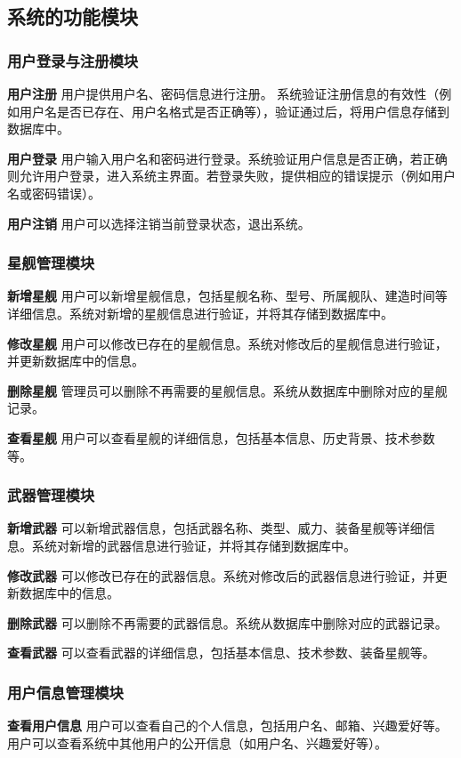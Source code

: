 \documentclass{base}
\begin{document}
\subsection{系统的功能模块}

\subsubsection{用户登录与注册模块}
\textbf{用户注册} 用户提供用户名、密码信息进行注册。
系统验证注册信息的有效性（例如用户名是否已存在、用户名格式是否正确等），验证通过后，将用户信息存储到数据库中。

\textbf{用户登录} 用户输入用户名和密码进行登录。系统验证用户信息是否正确，若正确则允许用户登录，进入系统主界面。若登录失败，提供相应的错误提示（例如用户名或密码错误）。

\textbf{用户注销} 用户可以选择注销当前登录状态，退出系统。

\subsubsection{星舰管理模块}

\textbf{新增星舰} 用户可以新增星舰信息，包括星舰名称、型号、所属舰队、建造时间等详细信息。系统对新增的星舰信息进行验证，并将其存储到数据库中。

\textbf{修改星舰} 用户可以修改已存在的星舰信息。系统对修改后的星舰信息进行验证，并更新数据库中的信息。

\textbf{删除星舰} 管理员可以删除不再需要的星舰信息。系统从数据库中删除对应的星舰记录。

\textbf{查看星舰} 用户可以查看星舰的详细信息，包括基本信息、历史背景、技术参数等。

\subsubsection{武器管理模块}

\textbf{新增武器} 可以新增武器信息，包括武器名称、类型、威力、装备星舰等详细信息。系统对新增的武器信息进行验证，并将其存储到数据库中。

\textbf{修改武器} 可以修改已存在的武器信息。系统对修改后的武器信息进行验证，并更新数据库中的信息。

\textbf{删除武器} 可以删除不再需要的武器信息。系统从数据库中删除对应的武器记录。

\textbf{查看武器} 可以查看武器的详细信息，包括基本信息、技术参数、装备星舰等。

\subsubsection{用户信息管理模块}
\textbf{查看用户信息} 用户可以查看自己的个人信息，包括用户名、邮箱、兴趣爱好等。用户可以查看系统中其他用户的公开信息（如用户名、兴趣爱好等）。
\end{document}
